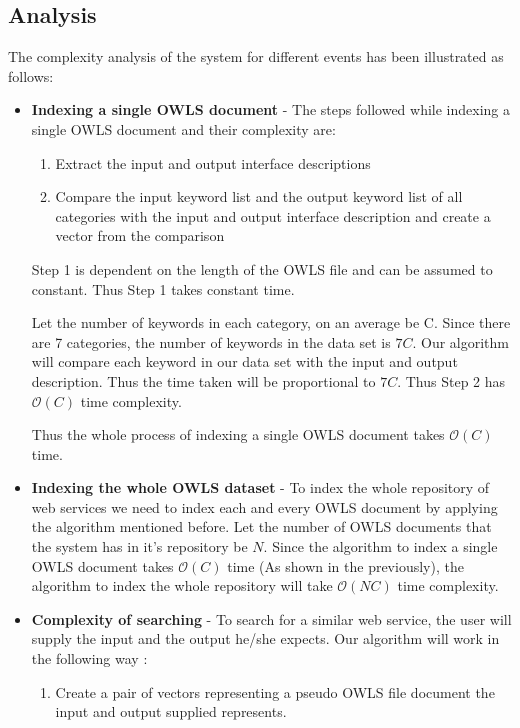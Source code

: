 \documentclass[12pt, twoside]{book}
\begin{document}
\subsection{Analysis}
The complexity analysis of the system for different events has been illustrated as follows:
\begin{itemize}
 \item \textbf{Indexing a single OWLS document} - The steps followed while indexing a single OWLS document and their complexity are:
 \begin{enumerate}
  \item Extract the input and output interface descriptions
  \item Compare the input keyword list and the output keyword list of all categories with the input and output interface description and create a vector from the comparison
 \end{enumerate}
 Step 1 is dependent on the length of the OWLS file and can be assumed to constant. Thus Step 1 takes constant time. \\ \par
 Let the number of keywords in each category, on an average be C. Since there are 7 categories, the number of keywords in the data set is $7C$. Our algorithm will compare each keyword in our data set with the input and output description. Thus the time taken will be proportional to $7C$. Thus Step 2 has $ \mathcal{O}(C)$ time complexity. \\ \par
 Thus the whole process of indexing a single OWLS document takes $\mathcal{O}(C)$ time.
 \item \textbf{Indexing the whole OWLS dataset} - To index the whole repository of web services we need to index each and every OWLS document by applying the algorithm mentioned before. Let the number of OWLS documents that the system has in it's repository be $N$. Since the algorithm to index a single OWLS document takes $\mathcal{O}(C)$ time (As shown in the previously), the algorithm to index the whole repository will take $\mathcal{O}(NC)$ time complexity.
 \item \textbf{Complexity of searching} - To search for a similar web service, the user will supply the input and the output he/she expects. Our algorithm will work in the following way :
 \begin{enumerate}
  \item Create a pair of vectors representing a pseudo OWLS file document the input and output supplied represents.

\end{enumerate}
\end{itemize}
\end{document}

